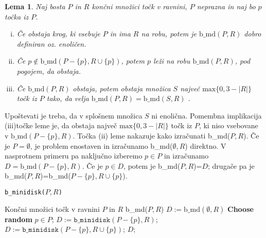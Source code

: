 \documentclass[a4paper]{article}
\newtheorem{lema}{Lema}
\begin{document}
\begin{lema}
Naj bosta $P$ in $R$ končni množici točk v ravnini, $P$ neprazna in naj bo $p$ točka iz $P$.
\begin{enumerate}[(i)]
\item Če obstaja krog, ki vsebuje $P$ in ima $R$ na robu, potem je $\mathrm{b\_md}(P,R)$ dobro definiran oz. enoličen.
\item Če $p \notin \mathrm{b\_md}(P-\{p\},R\cup \{p\})$, potem $p$ leži na robu $\mathrm{b\_md}(P,R)$, pod pogojem, da obstaja. 
\item Če $\mathrm{b\_md}(P,R)$  obstaja, potem obstaja množica $S$ največ $\mathrm{max}\{0,3-|R|\}$ točk iz $P$ tako, da velja $\mathrm{b\_md}(P,R) = \mathrm{b\_md}(S,R)$ .
\end{enumerate}
\end{lema}
Upoštevati je treba, da v splošnem množica $S$ ni enolična. Pomembna implikacija (iii)točke leme je, da obstaja največ $\mathrm{max}\{0,3-|R|\}$ točk iz $P$, ki niso vsebovane v $\mathrm{b\_md}(P-\{p\},R)$.
\newline Točka (ii) leme nakazuje kako izračunati b\_md($P,R$). Če je $P=\emptyset$, je problem enostaven in izračunamo b\_md($\emptyset,R$) direktno. V nasprotnem primeru pa naključno izberemo $p \in P$ in izračunamo $D=\mathrm{b\_md}(P-\{p\},R)$. Če je $p \in D$, potem je b\_md($P,R$)=$D$; drugače pa je b\_md($P,R$)=b\_md($P-\{p\},R\cup \{p\}$).

\begin{algorithm}[h]
\caption {\texttt{b\_minidisk($P,R$)}}
\begin{algorithmic} 
\REQUIRE Končni množici točk v ravnini $P$ in $R$
\ENSURE b\_md($P,R$)
\STATE $D := \mathrm{b\_md}(\emptyset,R)$
\ELSE
\STATE \textbf{Choose random} $p  \in P$;
\STATE $D := \texttt{b\_minidisk}(P-\{p\},R)$;
\STATE $D := \texttt{b\_minidisk}(P-\{p\},R\cup \{p\})$;
\ENDIF
\ENDIF
\RETURN $D$;
\end{algorithmic}
\end{algorithm}
\end{document}
